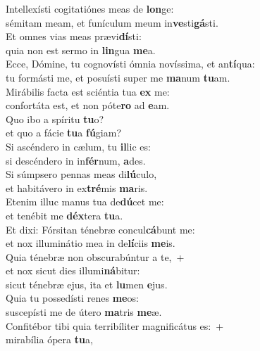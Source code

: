 \evenverse Intellexísti cogitatiónes meas de \textbf{lon}ge:~\*\\
\evenverse sémitam meam, et funículum meum in\textbf{ve}sti\textbf{gá}sti.\\
\oddverse Et omnes vias meas prævi\textbf{dí}sti:~\*\\
\oddverse quia non est sermo in \textbf{lin}gua \textbf{me}a.\\
\evenverse Ecce, Dómine, tu cognovísti ómnia novíssima, et an\textbf{tí}qua:~\*\\
\evenverse tu formásti me, et posuísti super me \textbf{ma}num \textbf{tu}am.\\
\oddverse Mirábilis facta est sciéntia tua \textbf{ex} me:~\*\\
\oddverse confortáta est, et non póte\textbf{ro} ad \textbf{e}am.\\
\evenverse Quo ibo a spíritu \textbf{tu}o?~\*\\
\evenverse et quo a fácie \textbf{tu}a \textbf{fú}giam?\\
\oddverse Si ascéndero in cælum, tu \textbf{il}lic es:~\*\\
\oddverse si descéndero in in\textbf{fér}num, \textbf{a}des.\\
\evenverse Si súmpsero pennas meas di\textbf{lú}culo,~\*\\
\evenverse et habitávero in ex\textbf{tré}mis \textbf{ma}ris.\\
\oddverse Etenim illuc manus tua de\textbf{dú}cet me:~\*\\
\oddverse et tenébit me \textbf{déx}tera \textbf{tu}a.\\
\evenverse Et dixi: Fórsitan ténebræ concul\textbf{cá}bunt me:~\*\\
\evenverse et nox illuminátio mea in de\textbf{lí}ciis \textbf{me}is.\\
\oddverse Quia ténebræ non obscurabúntur a te,~+\\
\oddverse  et nox sicut dies illumi\textbf{ná}bitur:~\*\\
\oddverse sicut ténebræ ejus, ita et \textbf{lu}men \textbf{e}jus.\\
\evenverse Quia tu possedísti renes \textbf{me}os:~\*\\
\evenverse suscepísti me de útero \textbf{ma}tris \textbf{me}æ.\\
\oddverse Confitébor tibi quia terribíliter magnificátus es:~+\\
\oddverse  mirabília ópera \textbf{tu}a,~\*\\

